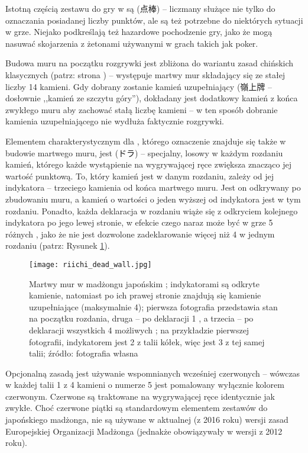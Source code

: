 Istotną częścią zestawu do gry w  są   (点棒) --
liczmany służące nie tylko do oznaczania posiadanej liczby punktów, ale są też
potrzebne do niektórych sytuacji w grze. Niejako podkreślają też hazardowe
pochodzenie gry, jako że mogą nasuwać skojarzenia z żetonami używanymi w grach
takich jak poker.

Budowa muru na początku rozgrywki jest zbliżona do wariantu 
zasad chińskich klasycznych (patrz: strona \pageref{cc_mixed_hand}) --
występuje martwy mur składający się ze stałej liczby 14 kamieni. Gdy dobrany
zostanie kamień uzupełniający (嶺上牌  -- dosłownie ,,kamień ze
szczytu góry''), dokładany jest dodatkowy kamień z końca zwykłego muru aby
zachować stałą liczbę kamieni -- w ten sposób dobranie kamienia uzupełniającego
nie wydłuża faktycznie rozgrywki.

Elementem charakterystycznym dla , którego oznaczenie znajduje się
także w budowie martwego muru, jest  (ドラ) -- specjalny, losowy w
każdym rozdaniu kamień, którego każde wystąpienie na wygrywającej ręce zwiększa
znacząco jej wartość punktową. To, który kamień jest  w danym
rozdaniu, zależy od jej indykatora -- trzeciego kamienia od końca martwego muru.
Jest on odkrywany po zbudowaniu muru, a kamień o wartości o jeden wyższej od
indykatora jest  w tym rozdaniu. Ponadto, każda deklaracja
 w rozdaniu wiąże się z odkryciem kolejnego indykatora po jego
lewej stronie, w efekcie czego naraz może być w grze 5 różnych ,
jako że nie jest dozwolone zadeklarowanie więcej niż 4  w jednym
rozdaniu (patrz: Rysunek \ref{fig:rīchi_dead_wall}).

\begin{figure}[H]
  \centering
  \texttt{[image: riichi\_dead\_wall.jpg]}
  \caption{Martwy mur w madżongu japońskim ; indykatorami
   są odkryte kamienie, natomiast po ich prawej stronie
  znajdują się kamienie uzupełniające (maksymalnie 4); pierwsza fotografia
  przedstawia stan na początku rozdania, druga -- po deklaracji 1
  , a trzecia -- po deklaracji wszystkich 4 możliwych
  ; na przykładzie pierwszej fotografii, indykatorem
   jest 2 z talii kółek, więc  jest 3 z tej samej
  talii; źródło: fotografia własna}
  \label{fig:rīchi_dead_wall}
\end{figure}

Opcjonalną zasadą jest używanie wspomnianych wcześniej czerwonych 
-- wówczas w każdej talii 1 z 4 kamieni o numerze 5 jest pomalowany wyłącznie
kolorem czerwonym. Czerwone  są traktowane na
wygrywającej ręce identycznie jak zwykłe. Choć czerwone piątki są standardowym
elementem zestawów do japońskiego madżonga, nie są używane w aktualnej (z 2016
roku) wersji zasad Europejskiej Organizacji Madżonga (jednakże obowiązywały w
wersji z 2012 roku).

